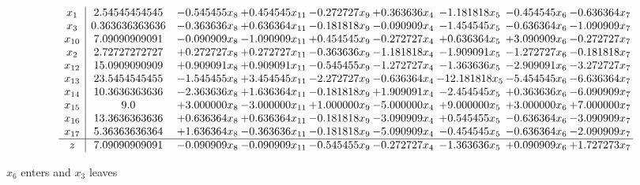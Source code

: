 \documentclass[10pt]{article}
\begin{document}
 \[\begin{array}{c| c c@{\hskip 2pt} c@{\hskip 2pt} c@{\hskip 2pt} c@{\hskip 2pt} c@{\hskip 2pt} c@{\hskip 2pt} c@{\hskip 2pt} }
 x_{1}   &  2.54545454545 & -0.545455 x_{8} & + 0.454545 x_{11} & -0.272727 x_{9} & + 0.363636 x_{4} & -1.181818 x_{5} & -0.454545 x_{6} & -0.636364 x_{7}\\
 x_{3}   &  0.363636363636 & -0.363636 x_{8} & + 0.636364 x_{11} & -0.181818 x_{9} & -0.090909 x_{4} & -1.454545 x_{5} & -0.636364 x_{6} & -1.090909 x_{7}\\
 x_{10}   &  7.09090909091 & -0.090909 x_{8} & -1.090909 x_{11} & + 0.454545 x_{9} & -0.272727 x_{4} & + 0.636364 x_{5} & + 3.090909 x_{6} & -0.272727 x_{7}\\
 x_{2}   &  2.72727272727 & + 0.272727 x_{8} & + 0.272727 x_{11} & -0.363636 x_{9} & -1.181818 x_{4} & -1.909091 x_{5} & -1.272727 x_{6} & -0.181818 x_{7}\\
 x_{12}   &  15.0909090909 & + 0.909091 x_{8} & + 0.909091 x_{11} & -0.545455 x_{9} & -1.272727 x_{4} & -1.363636 x_{5} & -2.909091 x_{6} & -3.272727 x_{7}\\
 x_{13}   &  23.5454545455 & -1.545455 x_{8} & + 3.454545 x_{11} & -2.272727 x_{9} & -0.636364 x_{4} & -12.181818 x_{5} & -5.454545 x_{6} & -6.636364 x_{7}\\
 x_{14}   &  10.3636363636 & -2.363636 x_{8} & + 1.636364 x_{11} & -0.181818 x_{9} & + 1.909091 x_{4} & -2.454545 x_{5} & + 0.363636 x_{6} & -6.090909 x_{7}\\
 x_{15}   &  9.0 & + 3.000000 x_{8} & -3.000000 x_{11} & + 1.000000 x_{9} & -5.000000 x_{4} & + 9.000000 x_{5} & + 3.000000 x_{6} & + 7.000000 x_{7}\\
 x_{16}   &  13.3636363636 & + 0.636364 x_{8} & + 0.636364 x_{11} & -0.181818 x_{9} & -3.090909 x_{4} & + 0.545455 x_{5} & -0.636364 x_{6} & -3.090909 x_{7}\\
 x_{17}   &  5.36363636364 & + 1.636364 x_{8} & -0.363636 x_{11} & -0.181818 x_{9} & -5.090909 x_{4} & -0.454545 x_{5} & -0.636364 x_{6} & -2.090909 x_{7}\\
\hline
z    &  7.09090909091 & -0.090909 x_{8} & -0.090909 x_{11} & -0.545455 x_{9} & -0.272727 x_{4} & -1.363636 x_{5} & + 0.090909 x_{6} & + 1.727273 x_{7}\\
\end{array}\]


 $ x_{6} $ enters and $ x_{3} $ leaves 
\end{document}
